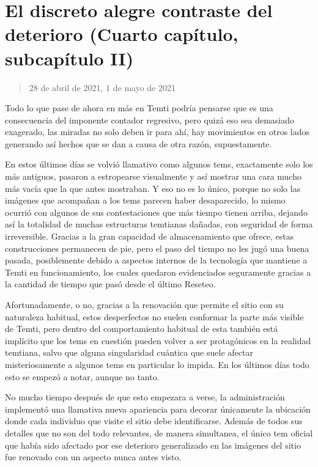 \documentclass[
  spanish,
]{book}
\begin{document}
\hypertarget{el-discreto-alegre-contraste-del-deterioro-cuarto-capuxedtulo-subcapuxedtulo-ii}{%
\section{El discreto alegre contraste del deterioro (Cuarto capítulo, subcapítulo II)}\label{el-discreto-alegre-contraste-del-deterioro-cuarto-capuxedtulo-subcapuxedtulo-ii}}

\begin{quote}
28 de abril de 2021, 1 de mayo de 2021
\end{quote}

Todo lo que pase de ahora en más en Temti podría pensarse que es una consecuencia del imponente contador regresivo, pero quizá eso sea demasiado exagerado, las miradas no solo deben ir para ahí, hay movimientos en otros lados generando así hechos que se dan a causa de otra razón, supuestamente.

En estos últimos días se volvió llamativo como algunos tems, exactamente solo los más antiguos, pasaron a estropearse visualmente y así mostrar una cara mucho más vacía que la que antes mostraban. Y eso no es lo único, porque no solo las imágenes que acompañan a los tems parecen haber desaparecido, lo mismo ocurrió con algunos de sus contestaciones que más tiempo tienen arriba, dejando así la totalidad de muchas estructuras temtianas dañadas, con seguridad de forma irreversible. Gracias a la gran capacidad de almacenamiento que ofrece, estas construcciones permanecen de pie, pero el paso del tiempo no les jugó una buena pasada, posiblemente debido a aspectos internos de la tecnología que mantiene a Temti en funcionamiento, los cuales quedaron evidenciados seguramente gracias a la cantidad de tiempo que pasó desde el último Reseteo.

Afortunadamente, o no, gracias a la renovación que permite el sitio con su naturaleza habitual, estos desperfectos no suelen conformar la parte más visible de Temti, pero dentro del comportamiento habitual de esta también está implícito que los tems en cuestión pueden volver a ser protagónicos en la realidad temtiana, salvo que alguna singularidad cuántica que suele afectar misteriosamente a algunos tems en particular lo impida. En los últimos días todo esto se empezó a notar, aunque no tanto.

No mucho tiempo después de que esto empezara a verse, la administración implementó una llamativa nueva apariencia para decorar únicamente la ubicación donde cada individuo que visite el sitio debe identificarse. Además de todos sus detalles que no son del todo relevantes, de manera simultanea, el único tem oficial que había sido afectado por ese deterioro generalizado en las imágenes del sitio fue renovado con un aspecto nunca antes visto.
\end{document}
